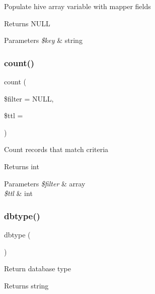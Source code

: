 Populate hive array variable with mapper fields \begin{DoxyReturn}{Returns}
N\+U\+LL 
\end{DoxyReturn}

\begin{DoxyParams}{Parameters}
{\em \$key} & string \\
\hline
\end{DoxyParams}
\hypertarget{class_d_b_1_1_cursor_ab1f3a3bd85dca49dceaea57f2fe21abf}{}\label{class_d_b_1_1_cursor_ab1f3a3bd85dca49dceaea57f2fe21abf} 
\subsubsection{\texorpdfstring{count()}{count()}}
{\footnotesize\ttfamily count (\begin{DoxyParamCaption}\item[{}]{\$filter = {\ttfamily NULL},  }\item[{}]{\$ttl = {} }\end{DoxyParamCaption})\hspace{0.3cm}{\ttfamily [abstract]}}

Count records that match criteria \begin{DoxyReturn}{Returns}
int 
\end{DoxyReturn}

\begin{DoxyParams}{Parameters}
{\em \$filter} & array \\
\hline
{\em \$ttl} & int \\
\hline
\end{DoxyParams}
\hypertarget{class_d_b_1_1_cursor_a38948c2fb1711f49b72f123cbd91e611}{}\label{class_d_b_1_1_cursor_a38948c2fb1711f49b72f123cbd91e611} 
\subsubsection{\texorpdfstring{dbtype()}{dbtype()}}
{\footnotesize\ttfamily dbtype (\begin{DoxyParamCaption}{ }\end{DoxyParamCaption})\hspace{0.3cm}{\ttfamily [abstract]}}

Return database type \begin{DoxyReturn}{Returns}
string 
\end{DoxyReturn}
\hypertarget{class_d_b_1_1_cursor_acc3a900450447c51540aaa9dec5959a4}{}\label{class_d_b_1_1_cursor_acc3a900450447c51540aaa9dec5959a4} 
